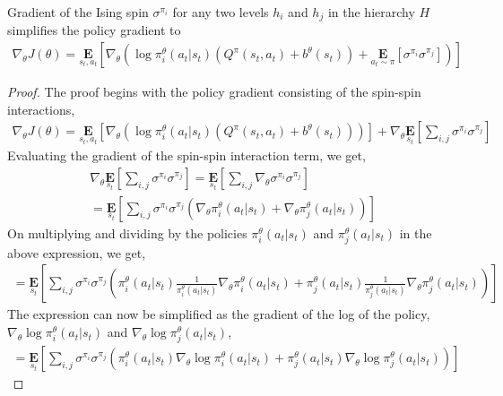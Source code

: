 \documentclass{article}
\begin{document}
\begin{prop}{4}\label{four}
    Gradient of the Ising spin $\sigma^{\pi_{i}}$ for any two levels $h_{i}$ and $h_{j}$ in the hierarchy $H$ simplifies the policy gradient to 
    \begin{gather}
        \nabla_{\theta}J(\theta) = \underset{s_{t},a_{t}}{\textbf{E}}[\nabla_{\theta}(\log \pi^{\theta}_{i}(a_{t}|s_{t})(Q^{\pi}(s_{t},a_{t}) + b^{\theta}(s_{t})) + \underset{a_{t} \sim \pi}{\textbf{E}}[\sigma^{\pi_{i}}\sigma^{\pi_{j}}])] \nonumber
    \end{gather}
\end{prop}
\begin{proof}
    The proof begins with the policy gradient consisting of the spin-spin interactions,
    \begin{gather}
        \nabla_{\theta}J(\theta) = \underset{s_{t},a_{t}}{\textbf{E}}[\nabla_{\theta}(\log \pi^{\theta}_{i}(a_{t}|s_{t})(Q^{\pi}(s_{t},a_{t}) + b^{\theta}(s_{t})))] + \nabla_{\theta}\underset{s_{t}}{\textbf{E}}[\sum_{i,j} \sigma^{\pi_{i}}\sigma^{\pi_{j}}] \nonumber
    \end{gather}
    Evaluating the gradient of the spin-spin interaction term, we get,
    \begin{gather}
        \nabla_{\theta} \underset{s_{t}}{\textbf{E}}[\sum_{i,j} \sigma^{\pi_{i}}\sigma^{\pi_{j}}] = \underset{s_{t}}{\textbf{E}}[\sum_{i,j} \nabla_{\theta}\sigma^{\pi_{i}}\sigma^{\pi_{j}}] \nonumber \\
        = \underset{s_{t}}{\textbf{E}}[\sum_{i,j}\sigma^{\pi_{i}}\sigma^{\pi_{j}}(\nabla_{\theta}\pi_{i}^{\theta}(a_{t}|s_{t}) + \nabla_{\theta}\pi_{j}^{\theta}(a_{t}|s_{t}))] \nonumber
    \end{gather}
    On multiplying and dividing by the policies $\pi_{i}^{\theta}(a_{t}|s_{t})$ and $\pi_{j}^{\theta}(a_{t}|s_{t})$ in the above expression, we get,
    \begin{gather}
        = \underset{s_{t}}{\textbf{E}}[\sum_{i,j}\sigma^{\pi_{i}}\sigma^{\pi_{j}}(\pi_{i}^{\theta}(a_{t}|s_{t})\frac{1}{\pi_{i}^{\theta}(a_{t}|s_{t})}\nabla_{\theta}\pi_{i}^{\theta}(a_{t}|s_{t}) + \pi_{j}^{\theta}(a_{t}|s_{t})\frac{1}{\pi_{j}^{\theta}(a_{t}|s_{t})}\nabla_{\theta}\pi_{j}^{\theta}(a_{t}|s_{t}))] \nonumber
    \end{gather}
    The expression can now be simplified as the gradient of the log of the policy, $\nabla_{\theta}\log\pi_{i}^{\theta}(a_{t}|s_{t})$ and $\nabla_{\theta}\log\pi_{j}^{\theta}(a_{t}|s_{t})$,
    \begin{gather}
        = \underset{s_{t}}{\textbf{E}}[\sum_{i,j}\sigma^{\pi_{i}}\sigma^{\pi_{j}}(\pi_{i}^{\theta}(a_{t}|s_{t})\nabla_{\theta}\log \pi_{i}^{\theta}(a_{t}|s_{t}) + \pi_{j}^{\theta}(a_{t}|s_{t})\nabla_{\theta}\log \pi_{j}^{\theta}(a_{t}|s_{t}))] \nonumber
    \end{gather}
    
\end{proof}


 

\end{document}
